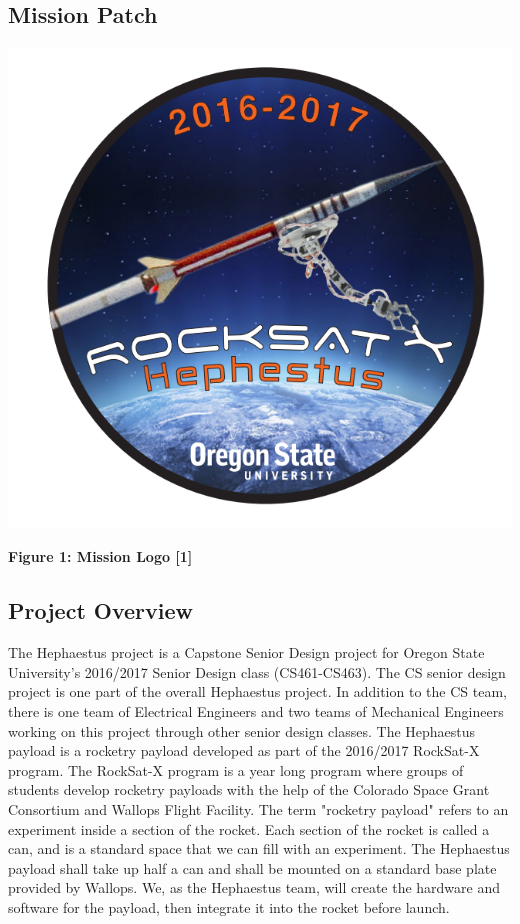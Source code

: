 \subsection{Mission Patch}
\includegraphics[width=\textwidth]{logo}
\begin{center}
\textbf{Figure 1: Mission Logo [1]}
\end{center}

\subsection{Project Overview}
The Hephaestus project is a Capstone Senior Design project for Oregon State University's 2016/2017 Senior Design class (CS461-CS463).
The CS senior design project is one part of the overall Hephaestus project.
In addition to the CS team, there is one team of Electrical Engineers and two teams of Mechanical Engineers working on this project through other senior design classes.
The Hephaestus payload is a rocketry payload developed as part of the 2016/2017 RockSat-X program.
The RockSat-X program is a year long program where groups of students develop rocketry payloads with the help of the Colorado Space Grant Consortium and Wallops Flight Facility.
The term "rocketry payload" refers to an experiment inside a section of the rocket.
Each section of the rocket is called a can, and is a standard space that we can fill with an experiment.
The Hephaestus payload shall take up half a can and shall be mounted on a standard base plate provided by Wallops.
We, as the Hephaestus team, will create the hardware and software for the payload, then integrate it into the rocket before launch.

